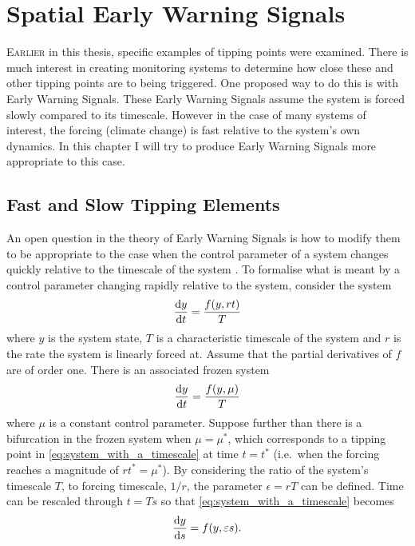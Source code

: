 \chapter{Spatial Early Warning Signals}
\label{chapter:spatial_ews}
\graphicspath{{spatial_ews/figs}}

\lettrine[lines=3,loversize=0.1,findent=0.1em,nindent=0em]{E}{arlier} in this thesis, specific examples of tipping points were examined.
There is much interest in creating monitoring systems to determine how close these and other tipping points are to being triggered.
One proposed way to do this is with Early Warning Signals. These Early Warning Signals assume the system is forced slowly compared to its timescale.
However in the case of many systems of interest, the forcing (climate change) is fast relative to the system's own dynamics.
In this chapter I will try to produce Early Warning Signals more appropriate to this case.

\section{Fast and Slow Tipping Elements}
An open question in the theory of Early Warning Signals is how to modify them to be appropriate to the case when the control parameter of a system
changes quickly relative to the timescale of the system \parencite{VanderBolt2021}. To formalise what is meant by a control parameter changing rapidly relative
to the system, consider the system
\begin{equation}
  \label{eq:system_with_a_timescale}
  \dv{y}{t} = \frac{f(y,rt)}{T}
\end{equation}
where $y$ is the system state, $T$ is a characteristic timescale of the system and $r$ is the rate the system is linearly forced
at. Assume that the partial derivatives of $f$ are of order one. There is an associated frozen system
\begin{equation}
  \label{eq:system_with_a_timescale_frozen}
  \dv{y}{t} = \frac{f(y,\mu)}{T}
\end{equation}
where $\mu$ is a constant control parameter. Suppose further than there is a bifurcation in the frozen system when
$\mu = \mu^*$, which corresponds to a tipping point in \cref{eq:system_with_a_timescale} at time $t = t^*$ (i.e.\ when the forcing reaches a magnitude of $rt^* = \mu^*$).
By considering the ratio of the system's timescale $T$, to forcing timescale, $1/r$,  the parameter $\epsilon = rT$ can be defined. Time can be rescaled through $t=Ts$
so that \cref{eq:system_with_a_timescale} becomes
\begin{equation}
  \label{eq:system_with_a_timescale_rescaled}
  \dv{y}{s} = f(y,\varepsilon s).
\end{equation}

